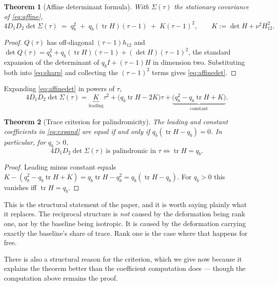 \documentclass[11pt]{article}
\theoremstyle{plain}
\newtheorem{theorem}{Theorem}
\theoremstyle{definition}
\theoremstyle{remark}
\newcommand{\tr}{\operatorname{tr}}
\newcommand{\Sig}{\Sigma}
\begin{document}
\begin{theorem}[Affine determinant formula]\label{thm:affine}
With $\Sig(\tau)$ the stationary covariance of \eqref{eq:affine},
\begin{equation}
  4D_1D_2\det\Sig(\tau)
  \;=\; q_b^2 \;+\; q_b(\tr H)(\tau-1) \;+\; K(\tau-1)^2,
  \qquad K:=\det H+\nu^2H_{12}^2. \label{eq:affinedet}
\end{equation}
\end{theorem}

\begin{proof}
$Q(\tau)$ has off-diagonal $(\tau-1)h_{12}$ and
$\det Q(\tau)=q_b^2+q_b(\tr H)(\tau-1)+(\det H)(\tau-1)^2$, the standard expansion of the
determinant of $q_bI+(\tau-1)H$ in dimension two. Substituting both into \eqref{eq:sharp} and
collecting the $(\tau-1)^2$ terms gives \eqref{eq:affinedet}.
\end{proof}

Expanding \eqref{eq:affinedet} in powers of $\tau$,
\begin{equation}
  4D_1D_2\det\Sig(\tau)
  = \underbrace{K}_{\text{leading}}\tau^2
  + \bigl(q_b\tr H-2K\bigr)\tau
  + \underbrace{\bigl(q_b^2-q_b\tr H+K\bigr)}_{\text{constant}}. \label{eq:expand}
\end{equation}

\begin{theorem}[Trace criterion for palindromicity]\label{thm:trace}
The leading and constant coefficients in \eqref{eq:expand} are equal if and only if
$q_b(\tr H-q_b)=0$. In particular, for $q_b>0$,
\begin{equation}
  4D_1D_2\det\Sig(\tau)\ \text{is palindromic in }\tau
  \iff \tr H=q_b. \label{eq:tracecrit}
\end{equation}
\end{theorem}

\begin{proof}
Leading minus constant equals $K-(q_b^2-q_b\tr H+K)=q_b\tr H-q_b^2=q_b(\tr H-q_b)$. For
$q_b>0$ this vanishes iff $\tr H=q_b$.
\end{proof}

This is the structural statement of the paper, and it is worth saying plainly what it replaces.
The reciprocal structure is \emph{not} caused by the deformation being rank one, nor by the
baseline being isotropic. It is caused by the deformation carrying exactly the baseline's share
of trace. Rank one is the case where that happens for free.

There is also a structural reason for the criterion, which we give now because it explains the
theorem better than the coefficient computation does --- though the computation above remains the
proof.
\end{document}
